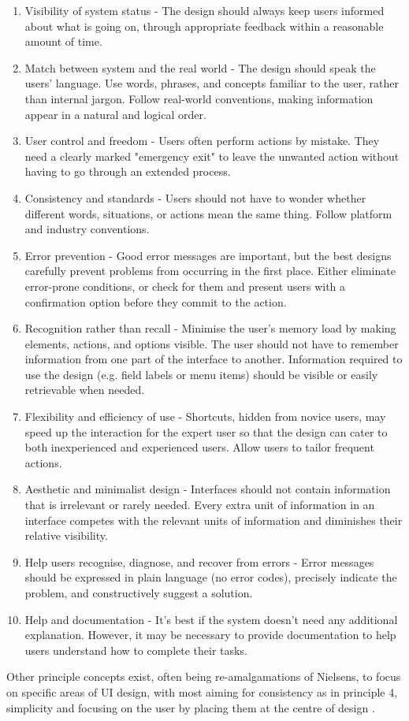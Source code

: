 \begin{enumerate}
    \item Visibility of system status - The design should always keep users informed about what is going on, through appropriate feedback within a reasonable amount of time.
    \item Match between system and the real world - The design should speak the users' language. Use words, phrases, and concepts familiar to the user, rather than internal jargon. Follow real-world conventions, making information appear in a natural and logical order.
    \item User control and freedom - Users often perform actions by mistake. They need a clearly marked "emergency exit" to leave the unwanted action without having to go through an extended process.
    \item Consistency and standards - Users should not have to wonder whether different words, situations, or actions mean the same thing. Follow platform and industry conventions.
    \item Error prevention - Good error messages are important, but the best designs carefully prevent problems from occurring in the first place. Either eliminate error-prone conditions, or check for them and present users with a confirmation option before they commit to the action.
    \item Recognition rather than recall - Minimise the user's memory load by making elements, actions, and options visible. The user should not have to remember information from one part of the interface to another. Information required to use the design (e.g. field labels or menu items) should be visible or easily retrievable when needed.
    \item Flexibility and efficiency of use - Shortcuts, hidden from novice users, may speed up the interaction for the expert user so that the design can cater to both inexperienced and experienced users. Allow users to tailor frequent actions.
    \item Aesthetic and minimalist design - Interfaces should not contain information that is irrelevant or rarely needed. Every extra unit of information in an interface competes with the relevant units of information and diminishes their relative visibility.
    \item Help users recognise, diagnose, and recover from errors - Error messages should be expressed in plain language (no error codes), precisely indicate the problem, and constructively suggest a solution.
    \item Help and documentation - It's best if the system doesn't need any additional explanation. However, it may be necessary to provide documentation to help users understand how to complete their tasks.
\end{enumerate}

Other principle concepts exist, often being re-amalgamations of Nielsens, to focus on specific areas of \ac{UI} design, with most aiming for consistency as in principle 4, simplicity and focusing on the user by placing them at the centre of design \cite{uxpin_2020_the}.
